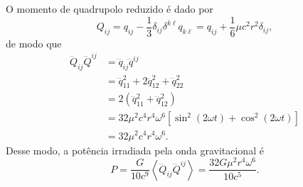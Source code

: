 O momento de quadrupolo reduzido é dado por
\begin{equation*}
    Q_{ij} = q_{ij} - \frac13 \delta_{ij} \delta^{k\ell}q_{k\ell} = q_{ij} + \frac16 \mu c^2 r^2 \delta_{ij},
\end{equation*}
de modo que
\begin{align*}
    \dddot{Q}_{ij} \dddot{Q}^{ij} &= \dddot{q}_{ij} \dddot{q}^{ij}\\&= \dddot{q}_{11}^2 + 2\dddot{q}_{12}^2 + \dddot{q}_{22}^2\\&= 2\left(\dddot{q}_{11}^2 + \dddot{q}_{12}^2\right)\\&= 32 \mu^2 c^4 r^4 \omega^6 \left[\sin^2(2 \omega t) + \cos^2(2 \omega t)\right]\\&= 32 \mu^2 c^4 r^4 \omega^6.
\end{align*}
Desse modo, a potência irradiada pela onda gravitacional é
\begin{equation*}
    P = \frac{G}{10c^9}\left\langle \dddot{Q}_{ij}\dddot{Q}^{ij}\right\rangle = \frac{32 G \mu^2 r^4 \omega^6}{10c^5}.
\end{equation*}


